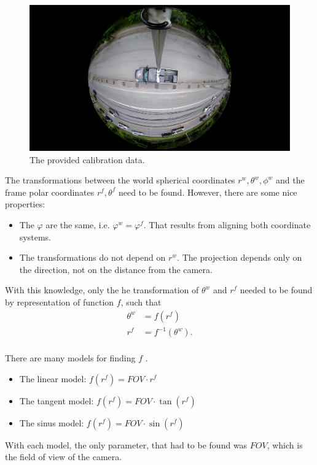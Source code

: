 \documentclass[a4paper,11pt,titlepage,twoside]{article}
\numberwithin{figure}{section}
\begin{document}
\begin{figure}[h!]
\centering
\includegraphics[width=0.7\linewidth]{fig/calibration.png}
\caption{The provided calibration data.}
\label{fig:calibration}
\end{figure}

The transformations between the world spherical coordinates $r^w, \theta^w, \phi^w$ and the frame polar coordinates $r^f, \theta^f$ need to be found. However, there are some nice properties:

\begin{itemize}
\item The $\varphi$ are the same, i.e. $\varphi^w = \varphi^f$. That results from aligning both coordinate systems. 
\item The transformations do not depend on $r^w$. The projection depends only on the direction, not on the distance from the camera.
\end{itemize}

With this knowledge, only the he transformation of $\theta^w$ and $r^f$ needed to be found by representation of function $f$, such that 
\begin{equation}
\begin{aligned}
\theta^w &= f(r^f) \\
r^f &= f^{-1}(\theta^w). \\
\end{aligned}
\end{equation}

There are many models for finding $f$ \cite{courbon2007generic}. 

\begin{itemize}
\item The linear model: $f(r^f) = FOV \cdot r^f$
\item The tangent model: $f(r^f) = FOV \cdot \tan(r^f)$
\item The sinus model: $f(r^f) = FOV \cdot \sin(r^f)$
\end{itemize}

With each model, the only parameter, that had to be found was $FOV$, which is the field of view of the camera.
\end{document}
